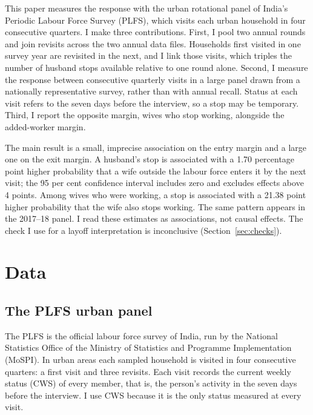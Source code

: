 This paper measures the response with the urban rotational panel of India's Periodic Labour Force Survey (PLFS), which visits each urban household in four consecutive quarters. I make three contributions. First, I pool two annual rounds and join revisits across the two annual data files. Households first visited in one survey year are revisited in the next, and I link those visits, which triples the number of husband stops available relative to one round alone. Second, I measure the response between consecutive quarterly visits in a large panel drawn from a nationally representative survey, rather than with annual recall. Status at each visit refers to the seven days before the interview, so a stop may be temporary. Third, I report the opposite margin, wives who stop working, alongside the added-worker margin.

The main result is a small, imprecise association on the entry margin and a large one on the exit margin. A husband's stop is associated with a 1.70 percentage point higher probability that a wife outside the labour force enters it by the next visit; the 95 per cent confidence interval includes zero and excludes effects above 4 points. Among wives who were working, a stop is associated with a 21.38 point higher probability that the wife also stops working. The same pattern appears in the 2017--18 panel. I read these estimates as associations, not causal effects. The check I use for a layoff interpretation is inconclusive (Section~\ref{sec:checks}).

\section{Data}

\subsection{The PLFS urban panel}

The PLFS is the official labour force survey of India, run by the National Statistics Office of the Ministry of Statistics and Programme Implementation (MoSPI). In urban areas each sampled household is visited in four consecutive quarters: a first visit and three revisits. Each visit records the current weekly status (CWS) of every member, that is, the person's activity in the seven days before the interview. I use CWS because it is the only status measured at every visit.

